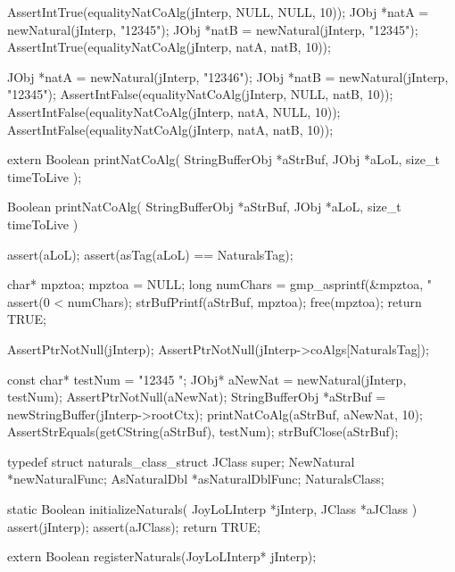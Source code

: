 \startCTest
  AssertIntTrue(equalityNatCoAlg(jInterp, NULL, NULL, 10));
  JObj *natA = newNatural(jInterp, "12345");
  JObj *natB = newNatural(jInterp, "12345");
  AssertIntTrue(equalityNatCoAlg(jInterp, natA, natB, 10));
\stopCTest
\stopTestCase


\startCTest
  JObj *natA = newNatural(jInterp, "12346");
  JObj *natB = newNatural(jInterp, "12345");
  AssertIntFalse(equalityNatCoAlg(jInterp, NULL, natB, 10));
  AssertIntFalse(equalityNatCoAlg(jInterp, natA, NULL, 10));
  AssertIntFalse(equalityNatCoAlg(jInterp, natA, natB, 10));
\stopCTest
\stopTestCase
\stopTestSuite



\startCHeader
extern Boolean printNatCoAlg(
  StringBufferObj *aStrBuf,
  JObj            *aLoL,
  size_t           timeToLive
);
\stopCHeader
{}

\startCCode
Boolean printNatCoAlg(
  StringBufferObj *aStrBuf,
  JObj            *aLoL,
  size_t           timeToLive
) {
  assert(aLoL);
  assert(asTag(aLoL) == NaturalsTag);

  char* mpztoa;
  mpztoa = NULL;
  long numChars = gmp_asprintf(&mpztoa, "%
  assert(0 < numChars);
  strBufPrintf(aStrBuf, mpztoa);
  free(mpztoa);
  return TRUE;
}
\stopCCode


\startCTest
  AssertPtrNotNull(jInterp);
  AssertPtrNotNull(jInterp->coAlgs[NaturalsTag]);

  const char* testNum = "12345 ";
  JObj* aNewNat = newNatural(jInterp, testNum);
  AssertPtrNotNull(aNewNat);
  StringBufferObj *aStrBuf = newStringBuffer(jInterp->rootCtx);
  printNatCoAlg(aStrBuf, aNewNat, 10);
  AssertStrEquals(getCString(aStrBuf), testNum);
  strBufClose(aStrBuf);
\stopCTest
\stopTestCase
\stopTestSuite

\startTestSuite[registerSymbols]

\startCHeader
typedef struct naturals_class_struct {
  JClass super;
  NewNatural   *newNaturalFunc;
  AsNaturalDbl *asNaturalDblFunc;
} NaturalsClass;
\stopCHeader

\startCCode
static Boolean initializeNaturals(
  JoyLoLInterp *jInterp,
  JClass   *aJClass
) {
  assert(jInterp);
  assert(aJClass);
  return TRUE;
}
\stopCCode

\startCHeader
extern Boolean registerNaturals(JoyLoLInterp* jInterp);
\stopCHeader
{}

